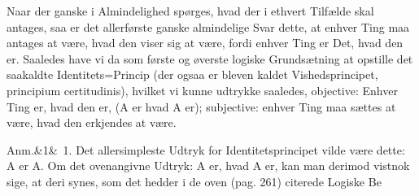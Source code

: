 \documentclass[12pt]{book}
\def\sperr#1{#1}%
\def\textit#1{#1}%
\def\emph#1{#1}%
\newcommand{\sperr}[1]{\textls[180]{#1}}
\newcommand{\anm}[1]{%
  \par\vspace{0.5\baselineskip}%
  \noindent\hspace{\parindent}\sperr{Anm.}\ifx&#1&\else~\textit{#1}.\fi
  \enspace\ignorespaces
}
\begin{document}
Naar der ganske i Almindelighed spørges, hvad der i ethvert Tilfælde skal
antages, saa er det allerførste ganske almindelige Svar dette, at enhver Ting
maa antages at være, hvad den viser sig at være, fordi enhver Ting er Det, hvad
den er. Saaledes have vi da som første og øverste logiske Grundsætning at
opstille det saakaldte Identitets=Princip (der ogsaa er bleven kaldet
\emph{Vishedsprincipet}, \textit{principium certitudinis}), hvilket vi kunne
udtrykke saaledes, \emph{objective}: \emph{Enhver Ting er, hvad den er,}
(\textit{A} \emph{er hvad} \textit{A} \emph{er}); \emph{subjective}:
\emph{enhver Ting maa sættes at være, hvad den erkjendes at være.}

\anm{1} Det allersimpleste Udtryk for Identitetsprincipet vilde være dette:
\textit{A} er \textit{A}. Om det ovenangivne Udtryk: \textit{A} er, hvad
\textit{A} er, kan man derimod vistnok sige, at deri synes, som det hedder i de
oven (pag. 261) citerede Logiske Be%
\end{document}
